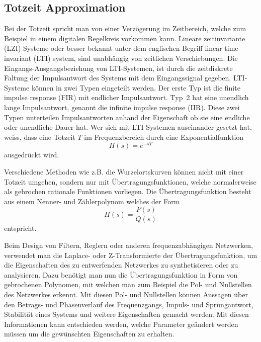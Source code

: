 \subsection{Totzeit Approximation
\label{pade:subsection:totzeit}}
%
%
%
%
%
Bei der Totzeit spricht man von einer Verzögerung im Zeitbereich, welche zum Beispiel in einem digitalen Regelkreis vorkommen kann.
Lineare zeitinvariante (LZI)-Systeme oder besser bekannt unter dem englischen Begriff linear time-invariant (LTI) system, sind unabhängig von zeitlichen Verschiebungen. 
%
%
%
Die Eingangs-Ausgangsbeziehung von LTI-Systemen, ist durch die
zeitdiskrete Faltung der Impulsantwort des Systems mit dem
Eingangssignal gegeben.
LTI-Systeme können in zwei Typen  eingeteilt werden.
Der erste Typ ist die finite impulse response (FIR) mit endlicher Impulsantwort.
%
%
%
%
Typ~2 hat eine unendlich lange Impulsantwort, genannt die infinite impulse response (IIR).
%
%
%
%
Diese zwei Typen unterteilen Impulsantworten anhand der Eigenschaft ob sie eine endliche oder unendliche Dauer hat. 
Wer sich mit LTI Systemen auseinander gesetzt hat, weiss, dass eine Totzeit $T$ im Frequenzbereich durch eine Exponentialfunktion
\begin{equation*}
H(s) = e^{-sT}
\end{equation*}
ausgedrückt wird.

Verschiedene Methoden wie z.B. die Wurzelortskurven können nicht mit einer Totzeit umgehen, sondern nur mit Übertragungsfunktionen, welche normalerweise als gebrochen rationale Funktionen vorliegen.
Die Übertragungsfunktion besteht aus einem Nenner- und Zählerpolynom welches der Form
\begin{equation*}
H(s)=\frac{P(s)}{Q(s)}
\end{equation*}
entspricht.

Beim Design von Filtern, Reglern oder anderen frequenzabhängigen Netzwerken, verwendet man die Laplace- oder Z-Transformierte der Übertragungsfunktion, um die Eigenschaften des zu entwerfenden Netzwerkes zu synthetisieren oder zu analysieren.
%
%
Dazu benötigt man nun die Übertragungsfunktion in Form von gebrochenen
Polynomen, mit welchen man zum Beispiel die Pol- und Nullstellen
des Netzwerkes erkennt.
Mit diesen Pol- und Nullstellen können Aussagen über den Betrags-
und Phasenverlauf des Frequenzgangs, Impuls- und Sprungantwort,
Stabilität eines Systems und weitere Eigenschaften gemacht werden.
%
%
%
%
%
Mit diesen Informationen kann entschieden werden, welche Parameter geändert werden müssen um die gewünschten Eigenschaften zu erhalten.
 
